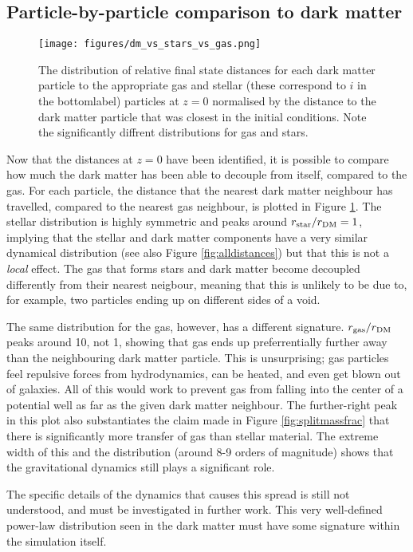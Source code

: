 \subsection{Particle-by-particle comparison to dark matter}

\begin{figure} \centering
	\texttt{[image: figures/dm\_vs\_stars\_vs\_gas.png]}
	\caption{The distribution of relative final state distances for each
	dark matter particle to the appropriate gas and stellar (these
	correspond to $i$ in the bottomlabel) particles at $z=0$ normalised by
	the distance to the dark matter particle that was closest in the
	initial conditions. Note the significantly diffrent distributions for
	gas and stars.}
\label{fig:dmvsstarvsgas} \end{figure}

Now that the distances at $z=0$ have been identified, it is possible to compare
how much the dark matter has been able to decouple from itself, compared to the
gas. For each particle, the distance that the nearest dark matter neighbour has
travelled, compared to the nearest gas neighbour, is plotted in Figure
\ref{fig:dmvsstarvsgas}. The stellar distribution is highly symmetric and peaks
around $r_{\rm star}/r_{\rm DM} = 1$, implying that the stellar and dark matter
components have a very similar dynamical distribution (see also Figure
\ref{fig:alldistances}) but that this is not a \emph{local} effect. The gas
that forms stars and dark matter become decoupled differently from their
nearest neigbour, meaning that this is unlikely to be due to, for example, two
particles ending up on different sides of a void.

The same distribution for the gas, however, has a different signature. $r_{\rm
gas}/r_{\rm DM}$ peaks around 10, not 1, showing that gas ends up
preferrentially further away than the neighbouring dark matter particle. This
is unsurprising; gas particles feel repulsive forces from hydrodynamics, can be
heated, and even get blown out of galaxies. All of this would work to prevent
gas from falling into the center of a potential well as far as the given dark
matter neighbour. The further-right peak in this plot also substantiates the
claim made in Figure \ref{fig:splitmassfrac} that there is significantly more
transfer of gas than stellar material. The extreme width of this and the
distribution (around 8-9 orders of magnitude) shows that the gravitational
dynamics still plays a significant role.

The specific details of the dynamics that causes this spread is still not
understood, and must be investigated in further work. This very well-defined
power-law distribution seen in the dark matter must have some signature within
the simulation itself.

